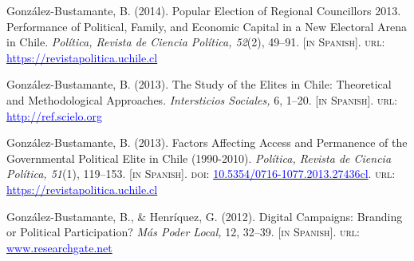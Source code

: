 \begin{publications}
\begin{benumerate}{14}
\item{\small González-Bustamante, B. (2014). Popular Election of Regional Councillors 2013. Performance of Political, Family, and Economic Capital in a New Electoral Arena in Chile. {\itshape Pol\'itica, Revista de Ciencia Pol\'itica, 52}(2), 49--91. {\footnotesize \scshape [in Spanish]}. {\scshape url}: \href{https://revistapolitica.uchile.cl/index.php/RP/article/view/36137}{\textcolor{blue}{https://revistapolitica.uchile.cl}}} \vspace{1mm}

\item{\small González-Bustamante, B. (2013). The Study of the Elites in Chile: Theoretical and Methodological Approaches. {\itshape Intersticios Sociales,} 6, 1--20. {\footnotesize \scshape [in Spanish]}. {\scshape url}: \href{http://ref.scielo.org/zrnp2k}{\textcolor{blue}{http://ref.scielo.org}}} \vspace{1mm}

\item{\small González-Bustamante, B. (2013). Factors Affecting Access and Permanence of the Governmental Political Elite in Chile (1990-2010). {\itshape Pol\'itica, Revista de Ciencia Pol\'itica, 51}(1), 119--153. {\footnotesize \scshape [in Spanish]}. {\scshape doi}: \href{https://doi.org/10.5354/0716-1077.2013.27436}{\textcolor{blue}{10.5354/0716-1077.2013.27436cl}}. {\scshape url}: \href{https://revistapolitica.uchile.cl/index.php/RP/article/view/27436}{\textcolor{blue}{https://revistapolitica.uchile.cl}}} \vspace{1mm}

\item{\small González-Bustamante, B., \& Henríquez, G. (2012). Digital Campaigns: Branding or Political Participation? {\itshape M\'as Poder Local,} 12, 32--39. {\footnotesize \scshape [in Spanish]}. {\scshape url}: \href{https://www.researchgate.net/publication/260517478_Campanas_digitales_Branding_o_participacion_politica_El_rol_de_las_redes_sociales_en_la_ultima_campana_presidencial_chilena}{\textcolor{blue}{www.researchgate.net}}} \vspace{1mm}

\end{benumerate}

\end{publications}
